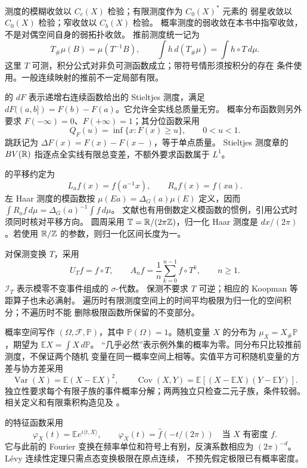 测度的模糊收敛以 \(C_c(X)\) 检验；有限测度作为 \(C_0(X)^*\) 元素的
弱星收敛以 \(C_0(X)\) 检验；窄收敛以 \(C_b(X)\) 检验。
概率测度的弱收敛在本书中指窄收敛，不是对偶空间自身的弱拓扑收敛。
推前测度统一记为
\[
 T_\#\mu(B)=\mu(T^{-1}B),\qquad
 \int h\,d(T_\#\mu)=\int h\circ T\,d\mu.
\]
这里 \(T\) 可测，积分公式对非负可测函数成立；带符号情形须按积分的存在
条件使用。一般连续映射的推前不一定局部有限。

的 \(dF\) 表示递增右连续函数给出的
Stieltjes 测度，满足 \(dF((a,b])=F(b)-F(a)\)。它允许全实线总质量无穷。
概率分布函数则另外要求
\(F(-\infty)=0\)、\(F(+\infty)=1\)；其分位函数采用
\[
 Q_F(u)=\inf\{x:F(x)\ge u\},\qquad 0<u<1.
\]
跳跃记为 \(\Delta F(x)=F(x)-F(x-)\)，等于单点质量。
Stieltjes 测度章的 \(BV(\mathbb{R})\) 指逐点全实线有限总变差，不额外要求函数属于 \(L^1\)。

的平移约定为
\[
 L_af(x)=f(a^{-1}x),\qquad R_af(x)=f(xa).
\]
左 Haar 测度的模函数按 \(\mu(Ea)=\Delta_G(a)\mu(E)\) 定义，因而
\(\int R_af\,d\mu=\Delta_G(a)^{-1}\int f\,d\mu\)。
文献也有用倒数定义模函数的惯例，引用公式时须同时核对平移方向。
圆周采用 \mbox{\(\mathbb T=\mathbb{R}/(2\pi\mathbb{Z})\)}，归一化 Haar 测度是
\(dx/(2\pi)\)。若使用 \(\mathbb{R}/\mathbb{Z}\) 的参数，则归一化区间长度为一。

对保测变换 \(T\)，采用
\[
 U_Tf=f\circ T,\qquad
 A_nf=\frac1n\sum_{k=0}^{n-1}f\circ T^k,\qquad n\ge1.
\]
\(\mathcal I_T\) 表示模零不变事件组成的 \(\sigma\)-代数。
保测不要求 \(T\) 可逆；相应的 Koopman 等距算子也未必满射。
遍历时有限测度空间上的时间平均极限为归一化的空间积分；不遍历时不能
删除极限函数所保留的不变部分。

概率空间写作 \((\Omega,\mathcal F,\mathbb P)\)，其中
\(\mathbb P(\Omega)=1\)。随机变量 \(X\) 的分布为
\(\mu_X=X_\#\mathbb P\)，期望为 \(\mathbb EX=\int X\,d\mathbb P\)。
“几乎必然”表示例外集的概率为零。同分布只比较推前测度，不保证两个随机
变量在同一概率空间上相等。实值平方可积随机变量的方差与协方差采用
\[
 \operatorname{Var}(X)=\mathbb E(X-\mathbb EX)^2,\qquad
 \operatorname{Cov}(X,Y)=\mathbb E[(X-\mathbb EX)(Y-\mathbb EY)].
\]
独立性要求每个有限子族的事件概率分解；两两独立只检查二元子族，条件较弱。
相关定义和有限乘积构造见及
。

的特征函数采用
\[
 \varphi_X(t)=\mathbb E e^{i\langle t,X\rangle},
 \qquad \varphi_X(t)=\widehat f(-t/(2\pi))\quad\text{当 }X\text{ 有密度 }f.
\]
它与此前的 Fourier 变换在频率单位和符号上有别，反演系数相应为
$(2\pi)^{-d}$。Lévy 连续性定理只需点态变换极限在原点连续，
不预先假定极限已有概率密度。

